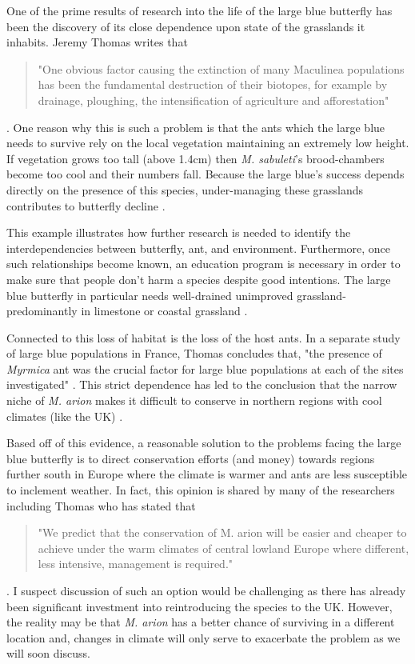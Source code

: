\documentclass[12pt, twocolumn, letterpaper]{article}
\begin{document}
One of the prime results of research into the life of the large blue butterfly has been the discovery of its close dependence upon state of the grasslands it inhabits. Jeremy Thomas writes that 
\begin{quote}
	"One obvious factor causing the extinction of many Maculinea populations has been the fundamental destruction of their biotopes, for example by drainage, ploughing, the intensification of agriculture and afforestation"
\end{quote}\cite{thomas_ecology_1995}. One reason why this is such a problem is that the ants which the large blue needs to survive rely on the local vegetation maintaining an extremely low height. If vegetation grows too tall (above 1.4cm) then \textit{M. sabuleti}'s brood-chambers become too cool and their numbers fall. Because the large blue's success depends directly on the presence of this species, under-managing these grasslands contributes to butterfly decline \cite{noauthor_how_2009}. 

This example illustrates how further research is needed to identify the interdependencies between butterfly, ant, and environment. Furthermore, once such relationships become known, an education program is necessary in order to make sure that people don't harm a species despite good intentions. The large blue butterfly in particular needs well-drained unimproved grassland- predominantly in limestone or coastal grassland \cite{noauthor_expanding_nodate}. 

Connected to this loss of habitat is the loss of the host ants. In a separate study of large blue populations in France, Thomas concludes that, "the presence of \textit{Myrmica} ant was the crucial factor for large blue populations at each of the sites investigated" \cite{thomas_behaviour_1984}. This strict dependence has led to the conclusion that the narrow niche of \textit{M. arion} makes it difficult to conserve in northern regions with cool climates (like the UK) \cite{thomas_effects_1998}. 

Based off of this evidence, a reasonable solution to the problems facing the large blue butterfly is to direct conservation efforts (and money) towards regions further south in Europe where the climate is warmer and ants are less susceptible to inclement weather. In fact, this opinion is shared by many of the researchers including Thomas who has stated that
\begin{quote}
	"We predict that the conservation of M. arion will be easier and cheaper to achieve under the warm climates of central lowland Europe where different, less intensive, management is required."
\end{quote}  
 \cite{thomas_effects_1998}. I suspect discussion of such an option would be challenging as there has already been significant investment into reintroducing the species to the UK. However, the reality may be that \textit{M. arion} has a better chance of surviving in a different location and, changes in climate will only serve to exacerbate the problem as we will soon discuss. 
 
\end{document}
